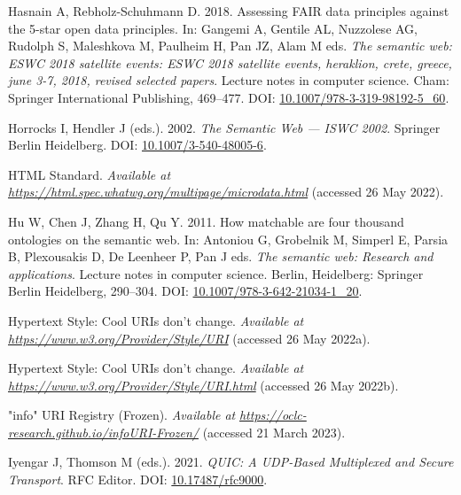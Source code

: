 \begin{CSLReferences}{1}{0}
\leavevmode{}%
Hasnain A, Rebholz-Schuhmann D. 2018. Assessing FAIR data principles against the 5-star open data principles. In: Gangemi A, Gentile AL, Nuzzolese AG, Rudolph S, Maleshkova M, Paulheim H, Pan JZ, Alam M eds. \emph{The semantic web: ESWC 2018 satellite events: ESWC 2018 satellite events, heraklion, crete, greece, june 3-7, 2018, revised selected papers}. Lecture notes in computer science. Cham: Springer International Publishing, 469--477. DOI: \href{https://doi.org/10.1007/978-3-319-98192-5_60}{10.1007/978-3-319-98192-5\_60}.

\leavevmode{}%
Horrocks I, Hendler J (eds.). 2002. \emph{The Semantic Web --- ISWC 2002}. Springer Berlin Heidelberg. DOI: \href{https://doi.org/10.1007/3-540-48005-6}{10.1007/3-540-48005-6}.

\leavevmode{}%
HTML Standard. \emph{Available at} \href{https://html.spec.whatwg.org/multipage/microdata.html}{\emph{https://html.spec.whatwg.org/multipage/microdata.html}} (accessed 26 May 2022).

\leavevmode{}%
Hu W, Chen J, Zhang H, Qu Y. 2011. How matchable are four thousand ontologies on the semantic web. In: Antoniou G, Grobelnik M, Simperl E, Parsia B, Plexousakis D, De Leenheer P, Pan J eds. \emph{The semantic web: Research and applications}. Lecture notes in computer science. Berlin, Heidelberg: Springer Berlin Heidelberg, 290--304. DOI: \href{https://doi.org/10.1007/978-3-642-21034-1_20}{10.1007/978-3-642-21034-1\_20}.

\leavevmode{}%
Hypertext Style: Cool URIs don't change. \emph{Available at} \href{https://www.w3.org/Provider/Style/URI}{\emph{https://www.w3.org/Provider/Style/URI}} (accessed 26 May 2022a).

\leavevmode{}%
Hypertext Style: Cool URIs don't change. \emph{Available at} \href{https://www.w3.org/Provider/Style/URI.html}{\emph{https://www.w3.org/Provider/Style/URI.html}} (accessed 26 May 2022b).

\leavevmode{}%
"info" URI Registry (Frozen). \emph{Available at} \href{https://oclc-research.github.io/infoURI-Frozen/}{\emph{https://oclc-research.github.io/infoURI-Frozen/}} (accessed 21 March 2023).

\leavevmode{}%
Iyengar J, Thomson M (eds.). 2021. \emph{QUIC: A UDP-Based Multiplexed and Secure Transport}. RFC Editor. DOI: \href{https://doi.org/10.17487/rfc9000}{10.17487/rfc9000}.


\end{CSLReferences}
